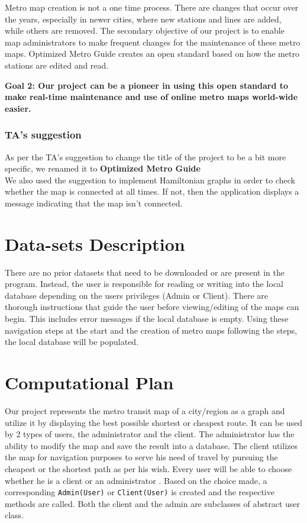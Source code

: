 \documentclass[fontsize=11pt]{article}
\begin{document}
    Metro map creation is not a one time process. There are changes that occur over the years, especially in newer cities, where new stations and lines are added, while others are removed. The secondary objective of our project is to enable map administrators to make frequent changes for the maintenance of these metro maps. Optimized Metro Guide creates an open standard based on how the metro stations are edited and read.\newline


    \textbf{Goal 2:
    Our project can be a pioneer in using this open standard to make real-time maintenance and use of online metro maps world-wide easier.
    }\newline

    \subsubsection*{TA's suggestion}
    As per the TA's suggestion to change the title of the project to be a bit more specific, we renamed it to
    \textbf{Optimized Metro Guide}\\
    We also used the suggestion to implement Hamiltonian graphs in order to check whether the map is connected at all times. If not, then the application displays a message indicating that the map isn't connected.
    \section*{Data-sets Description}
    There are no prior datasets that need to be downloaded or are present in the program. Instead, the user is responsible for reading or writing into the local database depending on the users privileges (Admin or Client). There are thorough instructions that guide the user before viewing/editing of the maps can begin. This includes error messages if the local database is empty. Using these navigation steps at the start and the creation of metro maps following the steps, the local database will be populated.

    \section*{Computational Plan}

    Our project represents the metro transit map of a city/region as a graph and utilize it by displaying the best possible shortest or cheapest route. It can be used by 2 types of users, the administrator and the client. The administrator has the ability to modify the map and save the result into a database. The client utilizes the map for navigation purposes to serve his need of travel by pursuing the cheapest or the shortest path as per his wish. Every user will be able to choose whether he is a client or an administrator . Based on the choice made, a corresponding \texttt{Admin(User)} or \texttt{Client(User)} is created and the respective methods are called. Both the client and the admin are subclasses of abstract user class.
\end{document}

